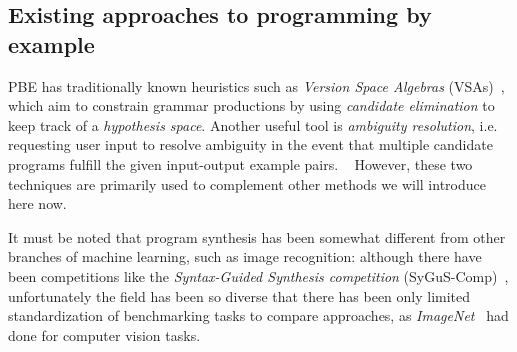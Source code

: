\documentclass{article}
\begin{document}
\subsection{Existing approaches to programming by example} \label{sec:pbe}

PBE has traditionally known heuristics such as
\emph{Version Space Algebras} (VSAs)~\citep{mitchell1982generalization},
which aim to constrain grammar productions by using
\emph{candidate elimination} to keep track of a \emph{hypothesis space}.
Another useful tool is \emph{ambiguity resolution},
i.e. requesting user input to resolve ambiguity
in the event that multiple candidate programs
fulfill the given input-output example pairs.%
~\citep{gulwani2017program}
However,
these two techniques are primarily used to complement
other methods we will introduce here now.

It must be noted that program synthesis has been somewhat different
from other branches of machine learning, such as image recognition:
although there have been competitions like the
\emph{Syntax-Guided Synthesis competition} (SyGuS-Comp)~\citep{sygus},
unfortunately the field has been so diverse that there has been only limited
standardization of benchmarking tasks to compare approaches,
as \emph{ImageNet}~\citep{deng2009imagenet} had done for computer vision tasks.%



\end{document}
